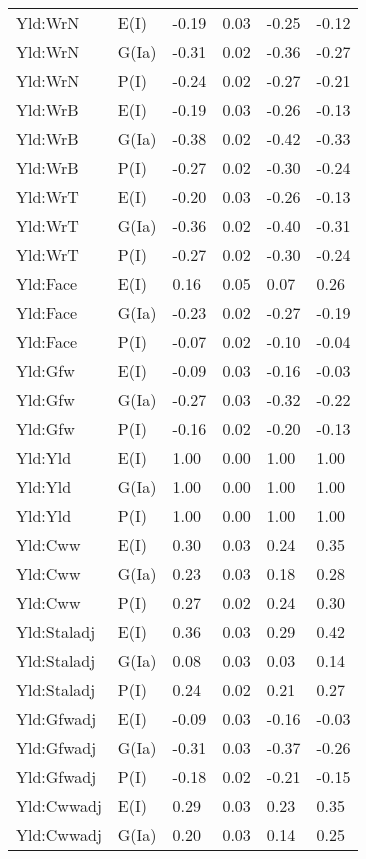 \begin{center}
\begin{longtable}{|p{1.1in}|p{0.7in}|p{0.7in}|p{0.6in}|p{0.6in}|p{0.6in}|}
  Yld:WrN & E(I) & -0.19 & 0.03 & -0.25 & -0.12 \\ 
  Yld:WrN & G(Ia) & -0.31 & 0.02 & -0.36 & -0.27 \\ 
  Yld:WrN & P(I) & -0.24 & 0.02 & -0.27 & -0.21 \\ 
  Yld:WrB & E(I) & -0.19 & 0.03 & -0.26 & -0.13 \\ 
  Yld:WrB & G(Ia) & -0.38 & 0.02 & -0.42 & -0.33 \\ 
  Yld:WrB & P(I) & -0.27 & 0.02 & -0.30 & -0.24 \\ 
  Yld:WrT & E(I) & -0.20 & 0.03 & -0.26 & -0.13 \\ 
  Yld:WrT & G(Ia) & -0.36 & 0.02 & -0.40 & -0.31 \\ 
  Yld:WrT & P(I) & -0.27 & 0.02 & -0.30 & -0.24 \\ 
  Yld:Face & E(I) & 0.16 & 0.05 & 0.07 & 0.26 \\ 
  Yld:Face & G(Ia) & -0.23 & 0.02 & -0.27 & -0.19 \\ 
  Yld:Face & P(I) & -0.07 & 0.02 & -0.10 & -0.04 \\ 
  Yld:Gfw & E(I) & -0.09 & 0.03 & -0.16 & -0.03 \\ 
  Yld:Gfw & G(Ia) & -0.27 & 0.03 & -0.32 & -0.22 \\ 
  Yld:Gfw & P(I) & -0.16 & 0.02 & -0.20 & -0.13 \\ 
  Yld:Yld & E(I) & 1.00 & 0.00 & 1.00 & 1.00 \\ 
  Yld:Yld & G(Ia) & 1.00 & 0.00 & 1.00 & 1.00 \\ 
  Yld:Yld & P(I) & 1.00 & 0.00 & 1.00 & 1.00 \\ 
  Yld:Cww & E(I) & 0.30 & 0.03 & 0.24 & 0.35 \\ 
  Yld:Cww & G(Ia) & 0.23 & 0.03 & 0.18 & 0.28 \\ 
  Yld:Cww & P(I) & 0.27 & 0.02 & 0.24 & 0.30 \\ 
  Yld:Staladj & E(I) & 0.36 & 0.03 & 0.29 & 0.42 \\ 
  Yld:Staladj & G(Ia) & 0.08 & 0.03 & 0.03 & 0.14 \\ 
  Yld:Staladj & P(I) & 0.24 & 0.02 & 0.21 & 0.27 \\ 
  Yld:Gfwadj & E(I) & -0.09 & 0.03 & -0.16 & -0.03 \\ 
  Yld:Gfwadj & G(Ia) & -0.31 & 0.03 & -0.37 & -0.26 \\ 
  Yld:Gfwadj & P(I) & -0.18 & 0.02 & -0.21 & -0.15 \\ 
  Yld:Cwwadj & E(I) & 0.29 & 0.03 & 0.23 & 0.35 \\ 
  Yld:Cwwadj & G(Ia) & 0.20 & 0.03 & 0.14 & 0.25 \\ 

\end{longtable}
\end{center}
